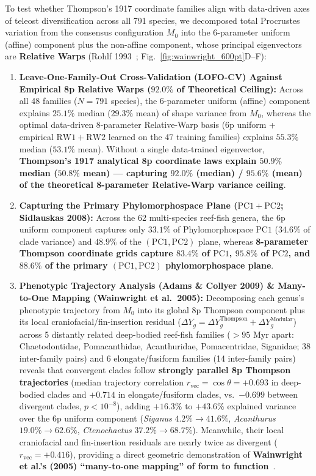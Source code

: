 \documentclass[11pt,a4paper]{article}
\theoremstyle{definition}
\theoremstyle{remark}
\begin{document}
To test whether Thompson's 1917 coordinate families align with data-driven axes of teleost diversification across all 791 species, we decomposed total Procrustes variation from the consensus configuration $M_0$ into the 6-parameter uniform (affine) component plus the non-affine component, whose principal eigenvectors are \textbf{Relative Warps} (Rohlf 1993~\cite{Rohlf1993}; Fig.~\ref{fig:wainwright_600pt}D--F):
\begin{enumerate}
  \item \textbf{Leave-One-Family-Out Cross-Validation (LOFO-CV) Against Empirical 8p Relative Warps ($92.0\%$ of Theoretical Ceiling):}
  Across all 48 families ($N = 791$ species), the 6-parameter uniform (affine) component explains $\mathbf{25.1\%}$ median ($29.3\%$ mean) of shape variance from $M_0$, whereas the optimal data-driven 8-parameter Relative-Warp basis (6p uniform + empirical $\mathrm{RW1} + \mathrm{RW2}$ learned on the 47 training families) explains $\mathbf{55.3\%}$ median ($53.1\%$ mean). Without a single data-trained eigenvector, \textbf{Thompson's 1917 analytical 8p coordinate laws explain $\mathbf{50.9\%}$ median ($50.8\%$ mean) --- capturing $\mathbf{92.0\%}$ (median) / $\mathbf{95.6\%}$ (mean) of the theoretical 8-parameter Relative-Warp variance ceiling}.
  \item \textbf{Capturing the Primary Phylomorphospace Plane ($\mathrm{PC1} + \mathrm{PC2}$; Sidlauskas 2008):}
  Across the 62 multi-species reef-fish genera, the 6p uniform component captures only $33.1\%$ of Phylomorphospace $\mathrm{PC1}$ ($34.6\%$ of clade variance) and $48.9\%$ of the $(\mathrm{PC1}, \mathrm{PC2})$ plane, whereas \textbf{8-parameter Thompson coordinate grids capture $\mathbf{83.4\%}$ of $\mathrm{PC1}$, $\mathbf{95.8\%}$ of $\mathrm{PC2}$, and $\mathbf{88.6\%}$ of the primary $(\mathrm{PC1}, \mathrm{PC2})$ phylomorphospace plane}.
  \item \textbf{Phenotypic Trajectory Analysis (Adams \& Collyer 2009) \& Many-to-One Mapping (Wainwright et al.\ 2005):}
  Decomposing each genus's phenotypic trajectory from $M_0$ into its global 8p Thompson component plus its local craniofacial/fin-insertion residual ($\Delta Y_g = \Delta Y_g^{\mathrm{Thompson}} + \Delta Y_g^{\mathrm{Modular}}$) across 5 distantly related deep-bodied reef-fish families ($>95\text{ Myr}$ apart: Chaetodontidae, Pomacanthidae, Acanthuridae, Pomacentridae, Siganidae; 38 inter-family pairs) and 6 elongate/fusiform families (14 inter-family pairs) reveals that convergent clades follow \textbf{strongly parallel 8p Thompson trajectories} (median trajectory correlation $r_{\mathrm{vec}} = \cos \theta = \mathbf{+0.693}$ in deep-bodied clades and $\mathbf{+0.714}$ in elongate/fusiform clades, vs.\ $\mathbf{-0.699}$ between divergent clades, $p < 10^{-8}$), adding $+16.3\%$ to $+43.6\%$ explained variance over the 6p uniform component (\emph{Siganus} $4.2\% \to 41.6\%$, \emph{Acanthurus} $19.0\% \to 62.6\%$, \emph{Ctenochaetus} $37.2\% \to 68.7\%$). Meanwhile, their local craniofacial and fin-insertion residuals are nearly twice as divergent ($r_{\mathrm{vec}} = +0.416$), providing a direct geometric demonstration of \textbf{Wainwright et al.'s (2005) ``many-to-one mapping'' of form to function}~\cite{Wainwright2005}.

\end{enumerate}
\end{document}
